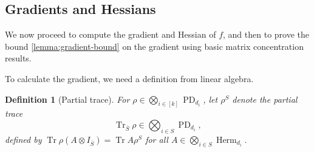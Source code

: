 \documentclass{article}
\newtheorem{definition}{Definition}
\newcommand\PD{\operatorname{PD}}
\newcommand\Herm{\operatorname{Herm}}
\newcommand\tr{\operatorname{Tr}}
\begin{document}
\subsection{Gradients and Hessians}

We now proceed to compute the gradient and Hessian of $f$, and then to prove the bound \cref{lemma:gradient-bound} on the gradient using basic matrix concentration results. 

To calculate the gradient, we need a definition from linear algebra. 
\begin{definition}[Partial trace] For $\rho \in  \bigotimes_{i \in [k]} \PD_{d_i}$, let
$\rho^S$ denote the partial trace $$\tr_{\bar{S}} \rho \in \bigotimes_{i \in S} \PD_{d_i},$$
defined by $\tr \rho(A \otimes I_{\bar{S}}) = \tr A \rho^S$ for all $A \in \bigotimes_{i \in S} \Herm_{d_i}.$
\end{definition}
\end{document}
